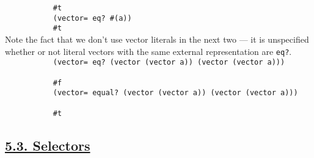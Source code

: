 \begin{description}
\texttt{\ \ \ \ \ \ \ \ \ \ \ \#t\ \ \ \ \ \ \ \ \ }\\[2\baselineskip]\texttt{\ \ \ \ \ \ \ \ \ \ \ (vector=\ eq?\ \textquotesingle{}\#(a))\ \ \ \ \ \ \ \ \ }\\
\texttt{\ \ \ \ \ \ \ \ \ \ \ \#t\ \ \ \ \ \ \ \ \ }\\[2\baselineskip]Note
the fact that we don't use vector literals in the next two --- it is
unspecified whether or not literal vectors with the same external
representation are
\texttt{eq?}.\\[2\baselineskip]\texttt{\ \ \ \ \ \ \ \ \ \ \ (vector=\ eq?\ (vector\ (vector\ \textquotesingle{}a))\ (vector\ (vector\ \textquotesingle{}a)))\ \ \ \ \ \ \ \ \ }\\
\texttt{\ \ \ \ \ \ \ \ \ \ \ \#f\ \ \ \ \ \ \ \ \ }\\[2\baselineskip]\texttt{\ \ \ \ \ \ \ \ \ \ \ (vector=\ equal?\ (vector\ (vector\ \textquotesingle{}a))\ (vector\ (vector\ \textquotesingle{}a)))\ \ \ \ \ \ \ \ \ }\\
\texttt{\ \ \ \ \ \ \ \ \ \ \ \#t\ \ \ \ \ \ \ \ \ }\\[2\baselineskip]
\end{description}

\subsection{\texorpdfstring{\href{}{5.3.
Selectors}}{5.3. Selectors}}\label{selectors}

